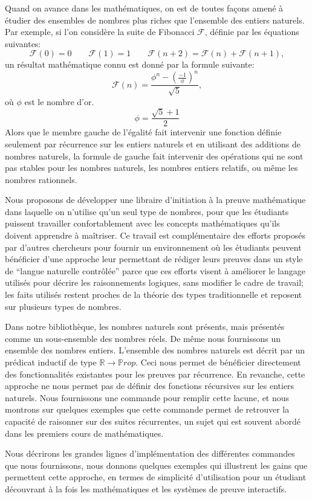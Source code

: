 \documentclass{modjflart}
\begin{document}
Quand on avance dans les mathématiques, on est de toutes façons amené à
étudier des ensembles de nombres plus riches que l'ensemble des
entiers naturels.  Par exemple, si l'on considère la suite de
Fibonacci \({\mathcal F}\), définie par les équations suivantes:
\[{\mathcal F}(0) = 0 \qquad {\mathcal F}(1)= 1\qquad {\mathcal F}(n +
2) = {\mathcal F}(n) + {\mathcal F}(n + 1),\]
un résultat mathématique connu est donné par la formule suivante:
\[{\mathcal F} (n) = \frac{\phi ^n - ({\frac{-1}{\phi}}) ^
  n}{\sqrt{5}},\]
où \(\phi\) est le nombre d'or.
\[\phi = \frac{\sqrt{5} + 1}{2}\]
Alors que le membre gauche de l'égalité fait intervenir une fonction définie
seulement par récurrence sur les entiers naturels et en utilisant des
additions de nombres naturels, la formule de gauche fait intervenir des
opérations qui ne sont pas stables pour les nombres naturels, les nombres
entiers relatifs, ou même les nombres rationnels.

Nous proposons de développer une libraire d'initiation à la preuve
mathématique dans laquelle on n'utilise qu'un seul type de nombres,
pour que les étudiants puissent travailler confortablement avec les
concepts mathématiques qu'ils doivent apprendre à maîtriser.  Ce
travail est complémentaire des efforts proposés par d'autres
chercheurs pour fournir un environnement où les étudiants peuvent
bénéficier d'une approche leur permettant de rédiger leurs preuves
dans un style de ``langue naturelle contrôlée'' parce que ces efforts
visent à améliorer le langage utilisés pour décrire les raisonnements
logiques, sans modifier le cadre de travail; les faits utilisés
restent proches de la théorie des types traditionnelle et reposent sur
plusieurs types de nombres.

Dans notre bibliothèque, les nombres naturels sont présents, mais
présentés comme un sous-ensemble des nombres réels.  De même nous
fournissons un ensemble des nombres entiers.  L'ensemble des
nombres naturels est
décrit par un prédicat inductif de type \({\mathbb R} \rightarrow
{\mathbb Prop}\).  Ceci nous permet de bénéficier directement des
fonctionnalités existantes pour les preuves par récurrence.  En
revanche, cette approche ne nous permet pas de définir des fonctions
récursives sur les entiers naturels.  Nous fournissons une commande
pour remplir cette lacune, et nous montrons sur quelques exemples que
cette commande permet de retrouver la capacité de raisonner sur des suites
récurrentes, un sujet qui est souvent abordé dans les premiers
cours de mathématiques.

Nous décrirons les grandes lignes d'implémentation des
différentes commandes que nous fournissons, nous donnons quelques exemples qui
illustrent les gains que permettent cette approche, en termes de
simplicité d'utilisation pour un étudiant découvrant à la fois les
mathématiques et les systèmes de preuve interactifs.
\end{document}
